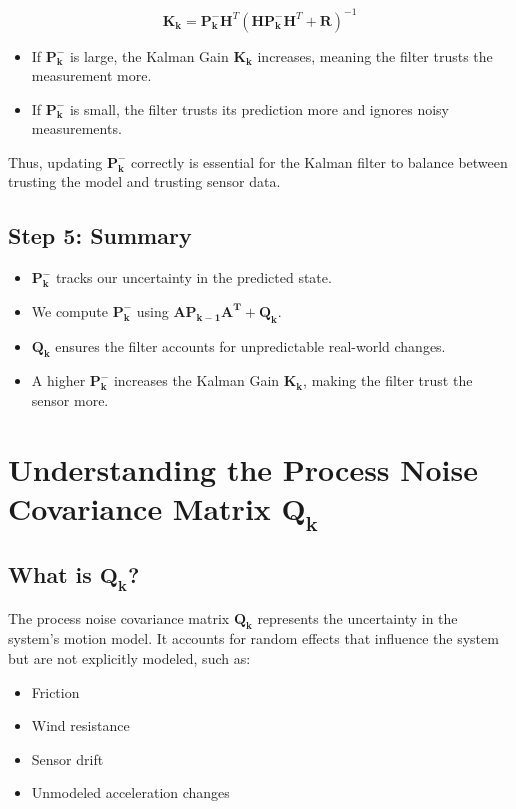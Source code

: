 \documentclass{article}
\begin{document}
\[
\mathbf{K_k} =
\mathbf{P_k^-} \mathbf{H}^T
(\mathbf{H P_k^- H}^T + \mathbf{R})^{-1}
\]

\begin{itemize}
    \item If \(\mathbf{P_k^-}\) is large, the Kalman Gain \(\mathbf{K_k}\) increases, meaning the filter trusts the measurement more.
    \item If \(\mathbf{P_k^-}\) is small, the filter trusts its prediction more and ignores noisy measurements.
\end{itemize}

Thus, updating \(\mathbf{P_k^-}\) correctly is essential for the Kalman filter to balance between trusting the model and trusting sensor data.

\subsection*{Step 5: Summary}
\begin{itemize}
    \item \(\mathbf{P_k^-}\) tracks our uncertainty in the predicted state.
    \item We compute \(\mathbf{P_k^-}\) using \(\mathbf{A P_{k-1} A^T} + \mathbf{Q_k}\).
    \item \(\mathbf{Q_k}\) ensures the filter accounts for unpredictable real-world changes.
    \item A higher \(\mathbf{P_k^-}\) increases the Kalman Gain \(\mathbf{K_k}\), making the filter trust the sensor more.
\end{itemize}

\newpage

\section{Understanding the Process Noise Covariance Matrix \(\mathbf{Q_k}\)}

\subsection*{What is \(\mathbf{Q_k}\)?}
The process noise covariance matrix \(\mathbf{Q_k}\) represents the uncertainty in the system's motion model. It accounts for random effects that influence the system but are not explicitly modeled, such as:
\begin{itemize}
    \item Friction
    \item Wind resistance
    \item Sensor drift
    \item Unmodeled acceleration changes
\end{itemize}
\end{document}
